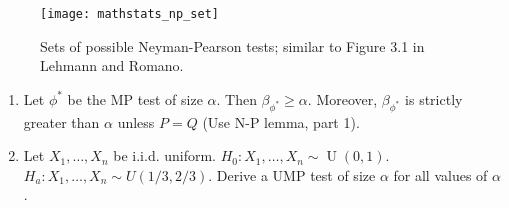 \begin{figure}[htbp]
\begin{center}
\texttt{[image: mathstats\_np\_set]}
\caption{Sets of possible Neyman-Pearson tests; similar to Figure 3.1 in Lehmann and Romano.}
\label{mathstats.fig.np.sets}
\end{center}
\end{figure}

\begin{exercise}

\begin{enumerate}

\item Let \(\phi^*\) be the MP test of size \(\alpha\). Then \(\beta_{\phi^*} \geq \alpha\). Moreover, \(\beta_{\phi^*}\) is strictly greater than \(\alpha\) unless \(P = Q\) (Use N-P lemma, part 1). 

\item Let \(X_1, \ldots, X_n\) be i.i.d. uniform. \(H_0: X_1, \ldots, X_n \sim \operatorname{U}(0,1)\). \(H_a: X_1, \ldots, X_n \sim U(1/3, 2/3)\). Derive a UMP test of size \(\alpha\) for all values of \(\alpha\).

\end{enumerate}

\end{exercise}

